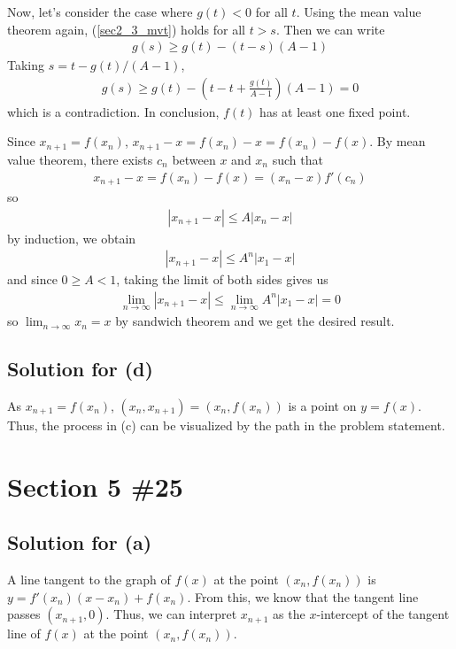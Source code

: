 \documentclass{scrartcl}
\begin{document}
Now, let's consider the case where \(g(t) < 0\) for all \(t\).
Using the mean value theorem again, (\ref{sec2_3_mvt}) holds for all \(t > s\).
Then we can write
\begin{align*}
  g(s) \geq g(t) - (t - s)(A - 1)
\end{align*}
Taking \(s = t - g(t) / (A - 1)\),
\begin{align*}
  g(s) \geq g(t) - \left( t - t + \frac{g(t)}{A - 1} \right) (A - 1) = 0
\end{align*}
which is a contradiction.
In conclusion, \(f(t)\) has at least one fixed point.

Since \(x_{n + 1} = f(x_n)\), \(x_{n + 1} - x = f(x_n) - x = f(x_n) - f(x)\).
By mean value theorem, there exists \(c_n\) between \(x\) and \(x_n\) such that
\begin{align*}
  x_{n + 1} - x = f(x_n) - f(x) = (x_n - x) f'(c_n)
\end{align*}
so
\begin{align*}
  |x_{n + 1} - x| \leq A |x_n - x|
\end{align*}
by induction, we obtain
\begin{align*}
  |x_{n + 1} - x| \leq A^n |x_1 - x|
\end{align*}
and since \(0 \geq A < 1\), taking the limit of both sides gives us
\begin{align*}
  \lim_{n \to \infty} |x_{n + 1} - x| \leq \lim_{n \to \infty} A^n |x_1 - x| = 0
\end{align*}
so \(\lim_{n \to \infty} x_n = x\) by sandwich theorem and we get the desired result.

\subsection{Solution for (d)}
As \(x_{n + 1} = f(x_n)\), \((x_n, x_{n + 1}) = (x_n, f(x_n))\) is a point on \(y = f(x)\).
Thus, the process in (c) can be visualized by the path in the problem statement.

\section{Section 5 \#25}
\subsection{Solution for (a)}
A line tangent to the graph of \(f(x)\) at the point \((x_n, f(x_n))\) is \(y = f'(x_n) (x - x_n) + f(x_n)\).
From this, we know that the tangent line passes \((x_{n + 1}, 0)\).
Thus, we can interpret \(x_{n + 1}\) as the \(x\)-intercept of the tangent line of \(f(x)\) at the point \((x_n, f(x_n))\).
\end{document}
